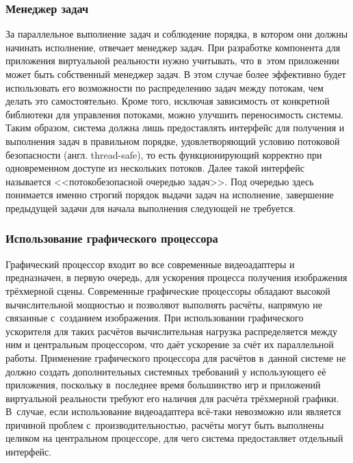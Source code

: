 \documentclass[a4paper, 14pt, titlepage]{extarticle}
\newcommand{\eng}[1]{{\English #1}}
\begin{document}
      \subsubsection{Менеджер задач}\label{sssec:task_manager}

        За параллельное выполнение задач и соблюдение порядка, в котором они должны начинать
        исполнение, отвечает менеджер задач. При разработке компонента
        для приложения виртуальной реальности нужно учитывать, что в~этом приложении
        может быть собственный менеджер задач. В этом случае более эффективно
        будет использовать его возможности по распределению задач между потокам, чем делать это
        самостоятельно. Кроме того, исключая зависимость от конкретной библиотеки для управления
        потоками, можно улучшить переносимость системы. Таким образом, система должна лишь
        предоставлять интерфейс для получения и выполнения задач в правильном порядке,
        удовлетворяющий условию потоковой безопасности (англ. \eng{thread-safe}), то есть
        функционирующий корректно при одновременном доступе из нескольких потоков. Далее такой
        интерфейс называется <<потокобезопасной очередью задач>>. Под очередью здесь понимается именно строгий порядок выдачи
        задач на исполнение, завершение предыдущей задачи для начала выполнения следующей не требуется.

      \subsubsection{Использование графического процессора}\label{sssec:using_gpu}

        Графический процессор входит во все современные видеоадаптеры и предназначен, в
        первую очередь, для ускорения процесса получения изображения трёхмерной сцены. Современные
        графические процессоры обладают высокой вычислительной мощностью и позволяют выполнять
        расчёты, напрямую не связанные с~созданием изображения. При использовании графического
        ускорителя для таких расчётов вычислительная нагрузка распределяется между ним и центральным
        процессором, что даёт ускорение за счёт их параллельной работы. Применение графического
        процессора для расчётов в~данной системе не должно создать дополнительных системных
        требований у использующего её приложения, поскольку в~последнее время большинство игр и
        приложений виртуальной реальности требуют его наличия для расчёта трёхмерной графики. В~случае, если
        использование видеоадаптера всё-таки невозможно или является причиной проблем
        с~производительностью, расчёты могут быть выполнены целиком на центральном процессоре, для
        чего система предоставляет отдельный интерфейс.
\end{document}
